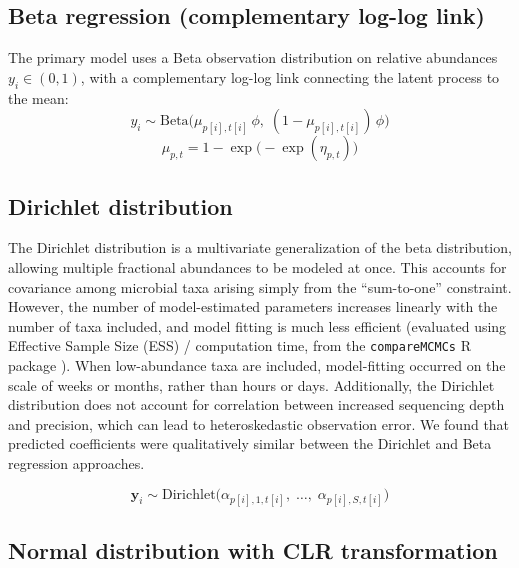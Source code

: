 \documentclass[11pt]{article}
\begin{document}
\subsection{Beta regression (complementary log-log link)}

The primary model uses a Beta observation distribution on relative abundances $y_i \in (0,1)$, with a complementary log-log link connecting the latent process to the mean:
\begin{equation}
y_i \sim \mathrm{Beta}\!\bigl(\mu_{p[i],t[i]}\,\phi,\;(1-\mu_{p[i],t[i]})\,\phi\bigr)
\end{equation}
\begin{equation}
\mu_{p,t} = 1 - \exp\!\bigl(-\exp(\eta_{p,t})\bigr)
\end{equation}

\subsection{Dirichlet distribution}

The Dirichlet distribution is a multivariate generalization of the beta distribution, allowing multiple fractional abundances to be modeled at once. This accounts for covariance among microbial taxa arising simply from the ``sum-to-one'' constraint. However, the number of model-estimated parameters increases linearly with the number of taxa included, and model fitting is much less efficient (evaluated using Effective Sample Size (ESS) / computation time, from the \texttt{compareMCMCs} R package \citep{DeValpine2022}). When low-abundance taxa are included, model-fitting occurred on the scale of weeks or months, rather than hours or days. Additionally, the Dirichlet distribution does not account for correlation between increased sequencing depth and precision, which can lead to heteroskedastic observation error. We found that predicted coefficients were qualitatively similar between the Dirichlet and Beta regression approaches.

\begin{equation}
\mathbf{y}_i \sim \mathrm{Dirichlet}\!\bigl(\alpha_{p[i],1,t[i]},\;\dots,\;\alpha_{p[i],S,t[i]}\bigr)
\end{equation}

\subsection{Normal distribution with CLR transformation}
\end{document}
